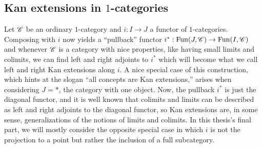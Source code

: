 \documentclass[../../thesis.tex]{subfiles}
\begin{document}
\subsection{Kan extensions in $1$-categories}
Let $\mathscr{C}$ be an ordinary $1$-category and $i : I \to J$ a functor of $1$-categories.
Composing with $i$ now yields a ``pullback'' functor $ i^* : \mathrm{Fun}(J, \mathscr{C}) \to \mathrm{Fun}(I, \mathscr{C})$ and whenever $\mathscr{C}$ is a category with nice properties, like having small limits and colimits, we can find left and right adjoints to $i^*$ which will become what we call left and right Kan extensions along $i$.
A nice special case of this construction, which hints at the slogan ``all concepts are Kan extensions,'' arises when considering $J = *$, the category with one object.
Now, the pullback $i^*$ is just the diagonal functor, and it is well known that colimits and limits can be described as left and right adjoints to the diagonal functor, so Kan extensions are, in some sense, generalizations of the notions of limits and colimits.
In this thesis's final part, we will mostly consider the opposite special case in which $i$ is not the projection to a point but rather the inclusion of a full subcategory.
\end{document}
